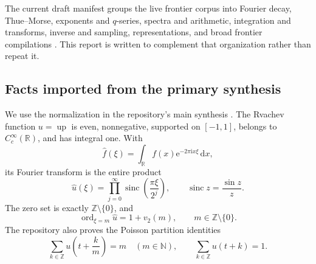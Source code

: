\documentclass[11pt,oneside]{article}
\theoremstyle{definition}
\theoremstyle{remark}
\newcommand{\R}{\mathbb R}
\newcommand{\Z}{\mathbb Z}
\newcommand{\N}{\mathbb N}
\newcommand{\Up}{\operatorname{up}}
\newcommand{\sinc}{\operatorname{sinc}}
\newcommand{\e}{\mathrm e}
\newcommand{\ii}{\mathrm i}
\newcommand{\dd}{\,\mathrm d}
\newcommand{\ord}{\operatorname{ord}}
\newcommand{\vtwo}{v_2}
\begin{document}
The current draft manifest groups the live frontier corpus into Fourier decay, Thue--Morse, exponents and $q$-series, spectra and arithmetic, integration and transforms, inverse and sampling, representations, and broad frontier compilations \cite{repoManifest}.  This report is written to complement that organization rather than repeat it.

\subsection{Facts imported from the primary synthesis}
We use the normalization in the repository's main synthesis \cite{repoMain}.  The Rvachev function $u=\Up$ is even, nonnegative, supported on $[-1,1]$, belongs to $C_c^\infty(\R)$, and has integral one.  With
\begin{equation}
 \widehat f(\xi)=\int_{\R}f(x)\e^{-2\pi\ii x\xi}\dd x,
\end{equation}
its Fourier transform is the entire product
\begin{equation}
 \widehat u(\xi)=\prod_{j=0}^{\infty}
 \sinc\!\left(\frac{\pi\xi}{2^j}\right),
 \qquad \sinc z=\frac{\sin z}{z}.                         \label{eq:fourier-product}
\end{equation}
The zero set is exactly $\Z\setminus\{0\}$, and
\begin{equation}
 \ord_{\xi=m}\widehat u=1+\vtwo(m),
 \qquad m\in\Z\setminus\{0\}.                          \label{eq:integer-orders}
\end{equation}
The repository also proves the Poisson partition identities
\begin{equation}
 \sum_{k\in\Z}u\!\left(t+\frac{k}{m}\right)=m
 \quad(m\in\N),
 \qquad
 \sum_{k\in\Z}u(t+k)=1.                                  \label{eq:partition}
\end{equation}
\end{document}
